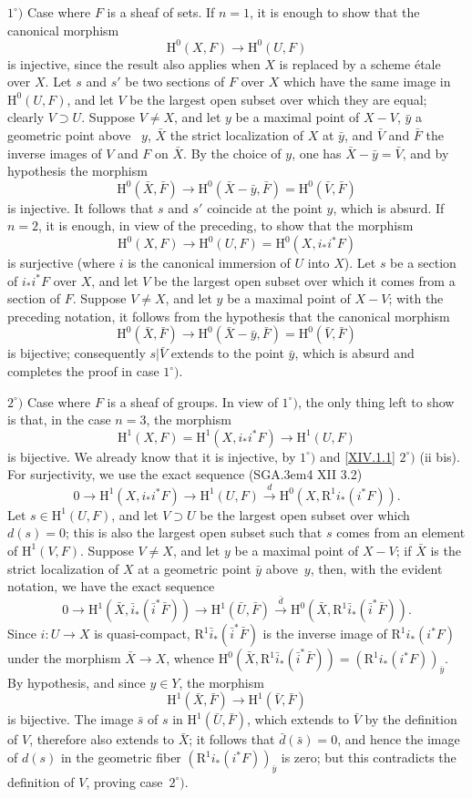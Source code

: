 \documentclass[11pt,a4paper,oneside]{book}
\providecommand{\pageoriginale}{%
  \refstepcounter{pageoriginal}%
  \marginpar{\raggedright\footnotesize\bfseries\thepageoriginal}%
  \xspace}
\providecommand{\SGA}{\textup{SGA}\kern.3em}
\renewcommand{\H}{\mathrm H}
\providecommand{\R}{\mathrm R}
\providecommand{\lto}[1]{\xrightarrow{#1}}
\theoremstyle{plain}
\theoremstyle{definition}
\theoremstyle{remark}
\renewcommand{\Ref}[1]{\textup{\ref{#1}}}
\begin{document}
$1^\circ)$ Case where $F$ is a sheaf of sets. If $n=1$, it is enough to show that the canonical morphism
$$
\H^0(X, F)\to \H^0(U, F)$$
is injective, since the result also applies when $X$ is replaced by a scheme étale over $X$. Let $s$ and $s'$ be two sections of $F$ over $X$ which have the same image in $\H^0(U, F)$, and let $V$ be the largest open subset over which they are equal; clearly $V\supset U$. Suppose $V\neq X$, and let $y$ be a maximal point of $X-V$, $\bar y$ a geometric point above\pageoriginale~$y$, $\bar X$ the strict localization of $X$ at $\bar y$, and $\bar V$ and $\bar F$ the inverse images of $V$ and $F$ on $\bar X$. By the choice of $y$, one has $\bar X-\bar y=\bar V$, and by hypothesis the morphism
$$
\H^0(\bar X, \bar F)\to \H^0(\bar X-\bar y, \bar F)=\H^0(\bar V, \bar F)$$
is injective. It follows that $s$ and $s'$ coincide at the point $y$, which is absurd. If $n=2$, it is enough, in view of the preceding, to show that the morphism
$$
\H^0(X, F)\to \H^0(U, F)=\H^0(X, i_*i^*F)$$
is surjective (where $i$ is the canonical immersion of $U$ into $X$). Let $s$ be a section of $i_*i^*F$ over $X$, and let $V$ be the largest open subset over which it comes from a section of $F$. Suppose $V\neq X$, and let $y$ be a maximal point of $X-V$; with the preceding notation, it follows from the hypothesis that the canonical morphism
$$
\H^0(\bar X, \bar F)\to \H^0(\bar X-\bar y, \bar F)=\H^0(\bar V, \bar F)
$$
is bijective; consequently $s|\bar V$ extends to the point $\bar y$, which is absurd and completes the proof in case $1^\circ)$.

$2^\circ)$ Case where $F$ is a sheaf of groups. In view of $1^\circ)$, the only thing left to show is that, in the case $n=3$, the morphism
$$
\H^1(X, F)=\H^1(X, i_*i^*F)\to \H^1(U, F)$$
is bijective. We already know that it is injective, by $1^\circ)$ and \Ref{XIV.1.1} $2^\circ)$ (ii bis). For surjectivity, we use the exact sequence (\SGA 4 XII 3.2)
$$
0\to \H^1(X, i_*i^*F)\to \H^1(U, F)\lto{d}\H^0(X, \R^1i_*(i^*F)).
$$
Let $s\in \H^1(U, F)$, and let $V\supset U$ be the largest open subset over which $d(s)=0$; this is\pageoriginale also the largest open subset such that $s$ comes from an element of $\H^1(V, F)$. Suppose $V\neq X$, and let $y$ be a maximal point of $X-V$; if $\bar X$ is the strict localization of $X$ at a geometric point $\bar y$ above~$y$, then, with the evident notation, we have the exact sequence
$$
0\to \H^1(\bar X, \bar i_*(\bar i^*\bar F))\to \H^1(\bar U, \bar F)\lto{\bar d}\H^0(\bar X, \R^1\bar i_*(\bar i^*\bar F)).
$$
Since $i:U\to X$ is quasi-compact, $\R^1\bar i_*(\bar i^*\bar F)$ is the inverse image of $\R^1i_*(i^*F)$ under the morphism $\bar X\to X$, whence $\H^0(\bar X, \R^1\bar i_*(\bar i^*\bar F))=(\R^1i_*(i^*F))_{\bar y}$. By hypothesis, and since $y\in Y$, the morphism
$$
\H^1(\bar X, \bar F)\to \H^1(\bar V, \bar F)
$$
is bijective. The image $\bar s$ of $s$ in $\H^1(\bar U, \bar F)$, which extends to $\bar V$ by the definition of $V$, therefore also extends to $\bar X$; it follows that $\bar d(\bar s)=0$, and hence the image of $d(s)$ in the geometric fiber $(\R^1i_*(i^*F))_{\bar y}$ is zero; but this contradicts the definition of $V$, proving case~$2^\circ)$.
\end{document}
